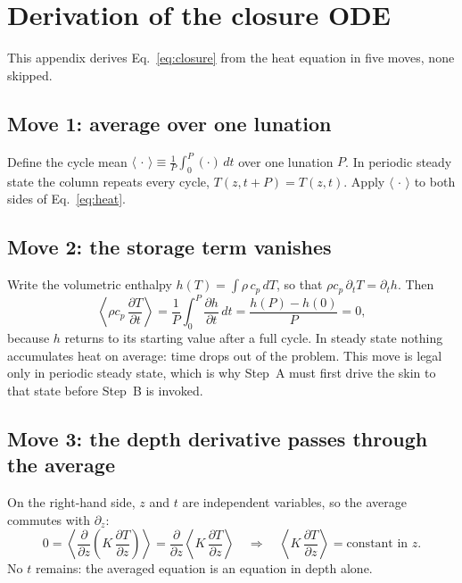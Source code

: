 \documentclass[11pt,a4paper,oneside]{report}
\begin{document}
\chapter{Derivation of the closure ODE}\label{app:derivation}

This appendix derives Eq.~\eqref{eq:closure} from the heat equation
in five moves, none skipped.

\section*{Move 1: average over one lunation}
Define the cycle mean $\langle\,\cdot\,\rangle \equiv
\frac{1}{P}\int_0^P (\cdot)\,dt$ over one lunation $P$. In periodic
steady state the column repeats every cycle, $T(z,t+P)=T(z,t)$. Apply
$\langle\,\cdot\,\rangle$ to both sides of Eq.~\eqref{eq:heat}.

\section*{Move 2: the storage term vanishes}
Write the volumetric enthalpy $h(T)=\int\rho\,c_p\,dT$, so that
$\rho c_p\,\partial_t T=\partial_t h$. Then
\begin{equation}
  \left\langle \rho c_p\,\frac{\partial T}{\partial t}\right\rangle
  = \frac{1}{P}\int_0^P \frac{\partial h}{\partial t}\,dt
  = \frac{h(P)-h(0)}{P} = 0,
\end{equation}
because $h$ returns to its starting value after a full cycle. In
steady state nothing accumulates heat on average: time drops out of
the problem. This move is legal only in periodic steady state, which
is why Step~A must first drive the skin to that state before Step~B
is invoked.

\section*{Move 3: the depth derivative passes through the average}
On the right-hand side, $z$ and $t$ are independent variables, so the
average commutes with $\partial_z$:
\begin{equation}
  0 = \left\langle \frac{\partial}{\partial z}
      \left(K\,\frac{\partial T}{\partial z}\right)\right\rangle
    = \frac{\partial}{\partial z}
      \left\langle K\,\frac{\partial T}{\partial z}\right\rangle
  \quad\Longrightarrow\quad
  \left\langle K\,\frac{\partial T}{\partial z}\right\rangle
  = \text{constant in } z.
\end{equation}
No $t$ remains: the averaged equation is an equation in depth alone.
\end{document}
